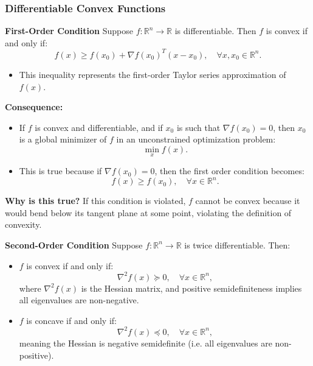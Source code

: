 \subsubsection{Differentiable Convex Functions}
\begin{definition}
    \textbf{First-Order Condition}
    Suppose \( f: \mathbb{R}^n \to \mathbb{R} \) is differentiable. Then \( f \) is convex if and only if:
    \[
    f(x) \geq f(x_0) + \nabla f(x_0)^T (x - x_0), \quad \forall x, x_0 \in \mathbb{R}^n.
    \]

    \begin{itemize}
        \item This inequality represents the first-order Taylor series approximation of \( f(x) \).
    \end{itemize}
    \vspace{1em}

    \textbf{Consequence:} 
    \begin{itemize}
        \item If \( f \) is convex and differentiable, and if \( x_0 \) is such that \( \nabla f(x_0) = 0 \), then \( x_0 \) is a global minimizer of \( f \) in an unconstrained optimization problem:
        \[
        \min_x f(x).
        \]
        \item This is true because if $\nabla f(x_0) = 0$, then the first order condition becomes:
        \[
        f(x) \geq f(x_0), \quad \forall x \in \mathbb{R}^n.
        \]
    \end{itemize}
\end{definition}

\begin{derivation}
    \textbf{Why is this true?} If this condition is violated, \( f \) cannot be convex because it would bend below its tangent plane at some point, violating the definition of convexity.
\end{derivation}

\begin{definition}
    \textbf{Second-Order Condition}
    Suppose \( f: \mathbb{R}^n \to \mathbb{R} \) is twice differentiable. Then:
    \begin{itemize}
        \item \( f \) is convex if and only if:
        \[
        \nabla^2 f(x) \succeq 0, \quad \forall x \in \mathbb{R}^n,
        \]
        where \( \nabla^2 f(x) \) is the Hessian matrix, and positive semidefiniteness implies all eigenvalues are non-negative.

        \item \( f \) is concave if and only if:
        \[
        \nabla^2 f(x) \preceq 0, \quad \forall x \in \mathbb{R}^n,
        \]
        meaning the Hessian is negative semidefinite (i.e. all eigenvalues are non-positive).
    \end{itemize}
\end{definition}

